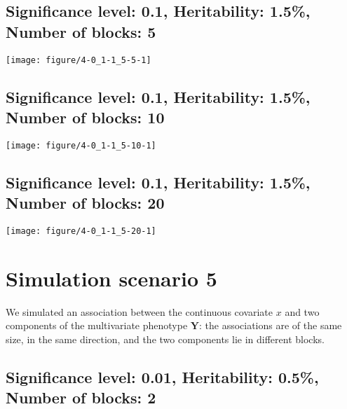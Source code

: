 \documentclass[11pt,letter]{article}\usepackage[]{graphicx}\usepackage[]{color}
\makeatletter
\def\maxwidth{ %
  \ifdim\Gin@nat@width>\linewidth
    \linewidth
  \else
    \Gin@nat@width
  \fi
}
\newenvironment{knitrout}{}{} %
\makeatother
\begin{document}
\newpage
\subsection{Significance level: 0.1, Heritability: 1.5\%, Number of blocks: 5}

\begin{knitrout}
\color{fgcolor}
\texttt{[image: figure/4-0\_1-1\_5-5-1]} 

\end{knitrout}

\newpage
\subsection{Significance level: 0.1, Heritability: 1.5\%, Number of blocks: 10}

\begin{knitrout}
\color{fgcolor}
\texttt{[image: figure/4-0\_1-1\_5-10-1]} 

\end{knitrout}

\newpage
\subsection{Significance level: 0.1, Heritability: 1.5\%, Number of blocks: 20}

\begin{knitrout}
\color{fgcolor}
\texttt{[image: figure/4-0\_1-1\_5-20-1]} 

\end{knitrout}

\newpage

\section{Simulation scenario 5}

We simulated an association between the continuous covariate $x$ and two components of the multivariate phenotype $\mathbf{Y}$: the associations are of the same size, in the same direction, and the two components lie in different blocks.

\newpage




\subsection{Significance level: 0.01, Heritability: 0.5\%, Number of blocks: 2}
\end{document}
